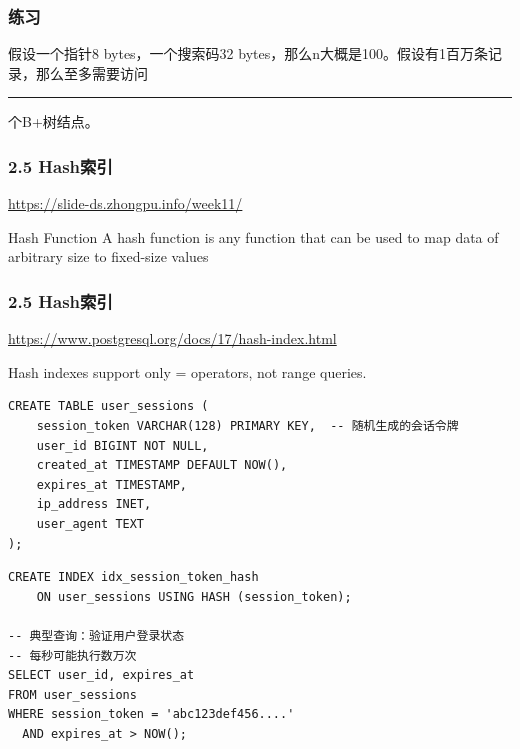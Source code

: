 \documentclass[aspectratio=169, 14pt]{beamer}
\begin{document}
\begin{frame}[fragile]
	\frametitle{练习}


	假设一个指针8 bytes，一个搜索码32 bytes，那么n大概是100。假设有1百万条记录，那么至多需要访问\rule{1cm}{0.15mm}个B+树结点。

\end{frame}

\begin{frame}[fragile]
	\frametitle{2.5 Hash索引}
	\url{https://slide-ds.zhongpu.info/week11/}

	\begin{block}{Hash Function}
		A hash function is any function that can be used to map data of arbitrary size to fixed-size values
	\end{block}


\end{frame}


\begin{frame}[fragile]
	\frametitle{2.5 Hash索引}
	\url{https://www.postgresql.org/docs/17/hash-index.html}

	Hash indexes support only \alert{=} operators, not range queries.

	\begin{verbatim}
CREATE TABLE user_sessions (
    session_token VARCHAR(128) PRIMARY KEY,  -- 随机生成的会话令牌
    user_id BIGINT NOT NULL,
    created_at TIMESTAMP DEFAULT NOW(),
    expires_at TIMESTAMP,
    ip_address INET,
    user_agent TEXT
);

  \end{verbatim}

\end{frame}

\begin{frame}[fragile]
	\begin{verbatim}
CREATE INDEX idx_session_token_hash 
    ON user_sessions USING HASH (session_token);

-- 典型查询：验证用户登录状态
-- 每秒可能执行数万次
SELECT user_id, expires_at 
FROM user_sessions 
WHERE session_token = 'abc123def456....' 
  AND expires_at > NOW();
  \end{verbatim}
\end{frame}
\end{document}
